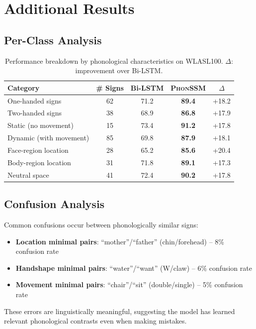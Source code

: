 \documentclass{article}
\newcommand{\phonssm}{\textsc{PhonSSM}}
\begin{document}
\section{Additional Results}

\subsection{Per-Class Analysis}

\begin{table}[ht]
\caption{Performance breakdown by phonological characteristics on WLASL100. $\Delta$: improvement over Bi-LSTM.}
\label{tab:perclass}
\vspace{-1mm}
\begin{center}
\begin{small}
\begin{tabular*}{\textwidth}{@{\extracolsep{\fill}}lcccc@{}}
\toprule
Category & \# Signs & Bi-LSTM & \phonssm{} & $\Delta$ \\
\midrule
One-handed signs & 62 & 71.2 & \textbf{89.4} & +18.2 \\
Two-handed signs & 38 & 68.9 & \textbf{86.8} & +17.9 \\
\midrule
Static (no movement) & 15 & 73.4 & \textbf{91.2} & +17.8 \\
Dynamic (with movement) & 85 & 69.8 & \textbf{87.9} & +18.1 \\
\midrule
Face-region location & 28 & 65.2 & \textbf{85.6} & +20.4 \\
Body-region location & 31 & 71.8 & \textbf{89.1} & +17.3 \\
Neutral space & 41 & 72.4 & \textbf{90.2} & +17.8 \\
\bottomrule
\end{tabular*}
\end{small}
\end{center}
\vspace{-2mm}
\end{table}

\subsection{Confusion Analysis}

Common confusions occur between phonologically similar signs:
\begin{itemize}[nosep,topsep=3pt,leftmargin=*]
\item \textbf{Location minimal pairs}: ``mother''/``father'' (chin/forehead) -- 8\% confusion rate
\item \textbf{Handshape minimal pairs}: ``water''/``want'' (W/claw) -- 6\% confusion rate
\item \textbf{Movement minimal pairs}: ``chair''/``sit'' (double/single) -- 5\% confusion rate
\end{itemize}
\vspace{1mm}
These errors are linguistically meaningful, suggesting the model has learned relevant phonological contrasts even when making mistakes.
\end{document}
